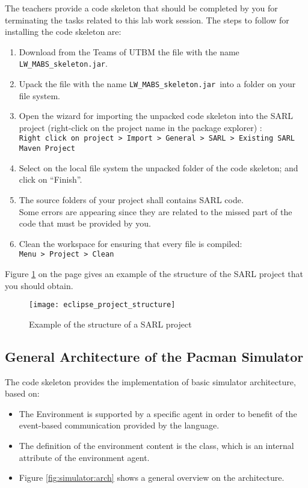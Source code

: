 \documentclass[article,english,nodocumentinfo,nosayenslogo,noicartslogo]{utbmciadreport}
\gdef\skeletonName{\texttt{\mbox{LW\_MABS\_skeleton\string.jar}}}
\begin{document}
The teachers provide a code skeleton that should be completed by you for terminating the tasks related to this lab work session.
The steps to follow for installing the code skeleton are:
\begin{enumerate}
\item Download from the Teams of UTBM the file with the name \skeletonName.
\item Upack the file with the name \skeletonName\ into a folder on your file system.
\item Open the wizard for importing the unpacked code skeleton into the SARL project (right-click on the project name in the package explorer)	: \\
	\texttt{Right click on project > Import > General > SARL > Existing SARL Maven Project}
\item Select on the local file system the unpacked folder of the code skeleton; and click on ``Finish''.
\item The source folders of your project shall contains SARL code. \\
	Some errors are appearing since they are related to the missed part of the code that must be provided by you. 
\item Clean the workspace for ensuring that every file is compiled: \\
	\texttt{Menu > Project > Clean}
\end{enumerate}

Figure \ref{fig:eclipse_project_structure} on the page \pageref{fig:eclipse_project_structure} gives an example of the structure of the SARL project that you should obtain.

\begin{figure}[p]
	\centering
	\texttt{[image: eclipse\_project\_structure]}
	\caption{Example of the structure of a SARL project}
	\label{fig:eclipse_project_structure}
\end{figure}

\subsection{General Architecture of the Pacman Simulator}

The code skeleton provides the implementation of basic simulator architecture, based on:
\begin{itemize}
\item The Environment is supported by a specific agent in order to benefit of the event-based communication provided by the \sarl language.
\item The definition of the environment content is the  class, which is an internal attribute of the environment agent.
\item Figure \ref{fig:simulator:arch} shows a general overview on the architecture.
\end{itemize}
\end{document}
